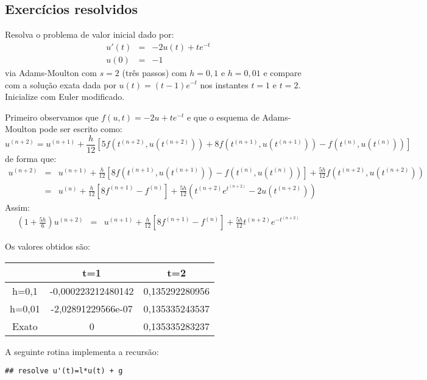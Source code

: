 \subsection*{Exercícios resolvidos}
\begin{exeresol} Resolva o problema de valor inicial dado por:
\begin{eqnarray*}
 u'(t)&=& -2u(t) + te^{-t}\\
 u(0)&=&-1
\end{eqnarray*}
via Adams-Moulton com $s=2$ (três passos) com $h=0,1$ e $h=0,01$ e compare com a solução exata dada por $u(t)=(t-1)e^{-t}$ nos instantes $t=1$ e $t=2$. Inicialize com Euler modificado.

 \end{exeresol}
\begin{resol}
 Primeiro observamos que $f(u,t)=-2u + te^{-t}$ e que o esquema de Adams-Moulton pode ser escrito como:
 \begin{equation*}
  u^{(n+2)}=u^{(n+1)}+\frac{h}{12}\left[5f\left(t^{(n+2)},u(t^{(n+2)})\right)+8f\left(t^{(n+1)},u(t^{(n+1)})\right)-f\left(t^{(n)},u(t^{(n)})\right)\right]
 \end{equation*}
 de forma que:
 \begin{eqnarray*}
  u^{(n+2)}&=&u^{(n+1)}+\frac{h}{12}\left[8f\left(t^{(n+1)},u(t^{(n+1)})\right)-f\left(t^{(n)},u(t^{(n)})\right)\right]+\frac{5h}{12}f\left(t^{(n+2)},u(t^{(n+2)})\right)\\
  &=&u^{(n)}+\frac{h}{12}\left[8f^{(n+1)}-f^{(n)}\right]+\frac{5h}{12}\left(t^{(n+2)}e^{t^{(n+2)}} -2 u(t^{(n+2)})\right)
   \end{eqnarray*}
 Assim:
 \begin{eqnarray*}
  \left(1+\frac{5h}{6}\right)u^{(n+2)}
  &=&u^{(n+1)}+\frac{h}{12}\left[8f^{(n+1)}-f^{(n)}\right]+\frac{5h}{12}t^{(n+2)}e^{-t^{(n+2)}} 
  \end{eqnarray*}
 
 Os valores obtidos são:
 
 \begin{tabular}{|c|c|c|}
 \hline
  &t=1&t=2\\
 \hline
  h=0,1  & -0,000223212480142 & 0,135292280956\\
  h=0,01 & -2,02891229566e-07& 0,135335243537\\
  Exato  & 0 & 0,135335283237\\
  \hline
 \end{tabular}
\ifispython
A seguinte rotina implementa a recursão:
\begin{verbatim}
## resolve u'(t)=l*u(t) + g


\end{verbatim}
\end{resol}
